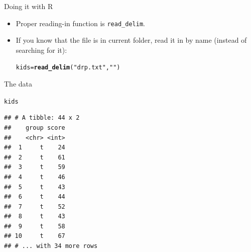 \documentclass[unknownkeysallowed]{beamer}\usepackage[]{graphicx}\usepackage[]{color}
\makeatletter
\newcommand{\hlstr}[1]{\textcolor[rgb]{0.192,0.494,0.8}{#1}}%
\newcommand{\hlstd}[1]{\textcolor[rgb]{0.345,0.345,0.345}{#1}}%
\newcommand{\hlkwb}[1]{\textcolor[rgb]{0.69,0.353,0.396}{#1}}%
\newcommand{\hlkwd}[1]{\textcolor[rgb]{0.737,0.353,0.396}{\textbf{#1}}}%
\newenvironment{kframe}{%
 \def\at@end@of@kframe{}%
 \ifinner\ifhmode%
  \def\at@end@of@kframe{\end{minipage}}%
  \begin{minipage}{\columnwidth}%
 \fi\fi%
 \def\FrameCommand##1{\hskip\@totalleftmargin \hskip-\fboxsep
 \colorbox{shadecolor}{##1}\hskip-\fboxsep
     \hskip-\linewidth \hskip-\@totalleftmargin \hskip\columnwidth}%
 \MakeFramed {\advance\hsize-\width
   \@totalleftmargin\z@ \linewidth\hsize
   \@setminipage}}%
 {\par\unskip\endMakeFramed%
 \at@end@of@kframe}
\newenvironment{knitrout}{}{} %
\makeatother
\begin{document}
\begin{frame}[fragile]{Doing it with R}

  \begin{itemize}
  \item Proper reading-in function is \texttt{read\_delim}.
  \item If you know that the file is in current folder, read it in by
    name (instead of searching for it):
    
\begin{knitrout}
\color{fgcolor}\begin{kframe}
\begin{alltt}
\hlstd{kids}\hlkwb{=}\hlkwd{read_delim}\hlstd{(}\hlstr{"drp.txt"}\hlstd{,}\hlstr{" "}\hlstd{)}
\end{alltt}


{\ttfamily\noindent\itshape\color{messagecolor}{\#\# Parsed with column specification:\\\#\# cols(\\\#\#\ \  group = col\_character(),\\\#\#\ \  score = col\_integer()\\\#\# )}}\end{kframe}
\end{knitrout}


  \end{itemize}
  
\end{frame}


\begin{frame}[fragile]{The data}
  
\begin{knitrout}\small
{}\color{fgcolor}\begin{kframe}
\begin{alltt}
\hlstd{kids}
\end{alltt}
\begin{verbatim}
## # A tibble: 44 x 2
##    group score
##    <chr> <int>
##  1     t    24
##  2     t    61
##  3     t    59
##  4     t    46
##  5     t    43
##  6     t    44
##  7     t    52
##  8     t    43
##  9     t    58
## 10     t    67
## # ... with 34 more rows
\end{verbatim}
\end{kframe}
\end{knitrout}
  
\end{frame}
\end{document}
